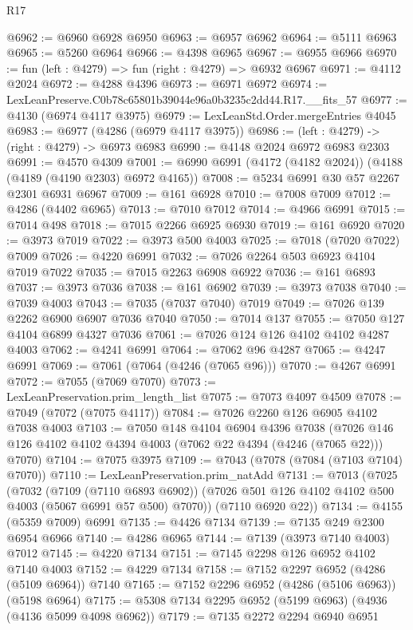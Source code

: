 \begin{lexlean}{R17}
\begin{coremodule}
@6962 := @6960 @6928 @6950
@6963 := @6957 @6962
@6964 := @5111 @6963
@6965 := @5260 @6964
@6966 := @4398 @6965
@6967 := @6955 @6966
@6970 := fun (left : @4279) => fun (right : @4279) => @6932 @6967
@6971 := @4112 @2024
@6972 := @4288 @4396
@6973 := @6971 @6972
@6974 := LexLeanPreserve.C0b78c65801b39044e96a0b3235c2dd44.R17.__fits_57
@6977 := @4130 (@6974 @4117 @3975)
@6979 := LexLeanStd.Order.mergeEntries @4045
@6983 := @6977 (@4286 (@6979 @4117 @3975))
@6986 := (left : @4279) -> (right : @4279) -> @6973 @6983
@6990 := @4148 @2024 @6972 @6983 @2303
@6991 := @4570 @4309
@7001 := @6990 @6991 (@4172 (@4182 @2024)) (@4188 (@4189 (@4190 @2303) @6972 @4165))
@7008 := @5234 @6991 @30 @57 @2267 @2301 @6931 @6967
@7009 := @161 @6928
@7010 := @7008 @7009
@7012 := @4286 (@4402 @6965)
@7013 := @7010 @7012
@7014 := @4966 @6991
@7015 := @7014 @498
@7018 := @7015 @2266 @6925 @6930
@7019 := @161 @6920
@7020 := @3973 @7019
@7022 := @3973 @500 @4003
@7025 := @7018 (@7020 @7022) @7009
@7026 := @4220 @6991
@7032 := @7026 @2264 @503 @6923 @4104 @7019 @7022
@7035 := @7015 @2263 @6908 @6922
@7036 := @161 @6893
@7037 := @3973 @7036
@7038 := @161 @6902
@7039 := @3973 @7038
@7040 := @7039 @4003
@7043 := @7035 (@7037 @7040) @7019
@7049 := @7026 @139 @2262 @6900 @6907 @7036 @7040
@7050 := @7014 @137
@7055 := @7050 @127 @4104 @6899 @4327 @7036
@7061 := @7026 @124 @126 @4102 @4102 @4287 @4003
@7062 := @4241 @6991
@7064 := @7062 @96 @4287
@7065 := @4247 @6991
@7069 := @7061 (@7064 (@4246 (@7065 @96)))
@7070 := @4267 @6991
@7072 := @7055 (@7069 @7070)
@7073 := LexLeanPreservation.prim_length_list
@7075 := @7073 @4097 @4509
@7078 := @7049 (@7072 (@7075 @4117))
@7084 := @7026 @2260 @126 @6905 @4102 @7038 @4003
@7103 := @7050
    @148
    @4104
    @6904
    @4396
    @7038
    (@7026 @146 @126 @4102 @4102 @4394 @4003 (@7062 @22 @4394 (@4246 (@7065 @22))) @7070)
@7104 := @7075 @3975
@7109 := @7043 (@7078 (@7084 (@7103 @7104) @7070))
@7110 := LexLeanPreservation.prim_natAdd
@7131 := @7013
    (@7025
      (@7032
        (@7109 (@7110 @6893 @6902))
        (@7026 @501 @126 @4102 @4102 @500 @4003 (@5067 @6991 @57 @500) @7070))
      (@7110 @6920 @22))
@7134 := @4155 (@5359 @7009) @6991
@7135 := @4426 @7134
@7139 := @7135 @249 @2300 @6954 @6966
@7140 := @4286 @6965
@7144 := @7139 (@3973 @7140 @4003) @7012
@7145 := @4220 @7134
@7151 := @7145 @2298 @126 @6952 @4102 @7140 @4003
@7152 := @4229 @7134
@7158 := @7152 @2297 @6952 (@4286 (@5109 @6964)) @7140
@7165 := @7152 @2296 @6952 (@4286 (@5106 @6963)) (@5198 @6964)
@7175 := @5308 @7134 @2295 @6952 (@5199 @6963) (@4936 (@4136 @5099 @4098 @6962))
@7179 := @7135 @2272 @2294 @6940 @6951

\end{coremodule}
\end{lexlean}

